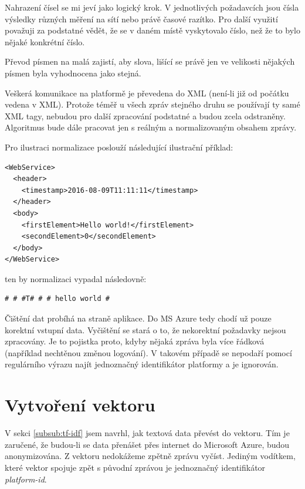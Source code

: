 \documentclass[thesis=M,czech]{FITthesis}[2012/10/20]
\begin{document}
		Nahrazení čísel se mi jeví jako logický krok. V jednotlivých požadavcích jsou čísla výsledky různých měření na sítí nebo právě časové razítko. Pro další využití považuji za podstatné vědět, že se v daném místě vyskytovalo číslo, než že to bylo nějaké konkrétní číslo.
		
		Převod písmen na malá zajistí, aby slova, lišící se právě jen ve velikosti nějakých písmen byla vyhodnocena jako stejná.
		
		Veškerá komunikace na platformě je převedena do XML (není-li již od počátku vedena v XML). Protože téměř u všech zpráv stejného druhu se používají ty samé XML tagy, nebudou pro další zpracování podstatné a budou zcela odstraněny. Algoritmus bude dále pracovat jen s reálným a normalizovaným obsahem zprávy. 
		
	 	Pro ilustraci normalizace poslouží následující ilustrační příklad:
	 	
	 	\begin{minipage}{\linewidth}
	 		\begin{lstlisting}[caption={Ilustrační příklad XML požadavku}, label={lst:xml-example}]
<WebService>
  <header>
    <timestamp>2016-08-09T11:11:11</timestamp>
  </header>
  <body>
    <firstElement>Hello world!</firstElement>
    <secondElement>0</secondElement>
  </body>
</WebService>
	 		\end{lstlisting}
	 	\end{minipage}
			
			ten by normalizaci vypadal následovně:
			
			\begin{minipage}{\linewidth}
				\begin{lstlisting}[caption={Ilustrační příklad po normalizaci}, label={lst:xml-example-normalized}]
# # #T# # # hello world #
				\end{lstlisting}
			\end{minipage}
		
		Čištění dat probíhá na straně aplikace. Do MS Azure tedy chodí už pouze korektní vstupní data. Vyčištění se stará o to, že nekorektní požadavky nejsou zpracovány. Je to pojistka proto, kdyby nějaká zpráva byla více řádková (například nechtěnou změnou logování). V takovém případě se nepodaří pomocí regulárního výrazu najít jednoznačný identifikátor platformy a  je ignorován.
			
	\section{Vytvoření vektoru}
		\label{sec:construct_vector}
		V sekci \ref{subsub:tf-idf} jsem navrhl, jak textová data převést do vektoru. Tím je zaručené, že budou-li se data přenášet přes internet do Microsoft Azure, budou anonymizována. Z vektoru nedokážeme zpětně zprávu vyčíst. Jediným vodítkem, které vektor spojuje zpět s původní zprávou je jednoznačný identifikátor \textit{platform-id}.
		
\end{document}
